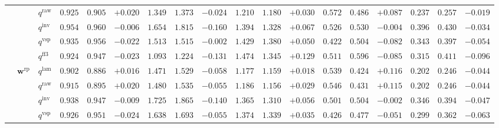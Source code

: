 \documentclass{article}
\begin{document}
\begin{table}[!htbp]
{\begin{tabular}{lll ccc ccc ccc ccc ccc}
 &  & $q^{\mathrm{raw}}$ & $0.925$ & $0.905$ & \cellcolor{posgreen!50}$+0.020$ & $1.349$ & $1.373$ & \cellcolor{negred!50}$-0.024$ & $1.210$ & $1.180$ & \cellcolor{posgreen!50}$+0.030$ & $0.572$ & $0.486$ & \cellcolor{posgreen!50}$+0.087$ & $0.237$ & $0.257$ & \cellcolor{negred!50}$-0.019$ \\
 &  & $q^{\mathrm{inv}}$ & $0.954$ & $0.960$ & \cellcolor{negred!50}$-0.006$ & $1.654$ & $1.815$ & \cellcolor{negred!50}$-0.160$ & $1.394$ & $1.328$ & \cellcolor{posgreen!50}$+0.067$ & $0.526$ & $0.530$ & \cellcolor{negred!50}$-0.004$ & $0.396$ & $0.430$ & \cellcolor{negred!50}$-0.034$ \\
 &  & $q^{\mathrm{vsp}}$ & $0.935$ & $0.956$ & \cellcolor{negred!50}$-0.022$ & $1.513$ & $1.515$ & \cellcolor{negred!50}$-0.002$ & $1.429$ & $1.380$ & \cellcolor{posgreen!50}$+0.050$ & $0.422$ & $0.504$ & \cellcolor{negred!50}$-0.082$ & $0.343$ & $0.397$ & \cellcolor{negred!50}$-0.054$ \\
 &  & $q^{\mathrm{ff3}}$ & $0.924$ & $0.947$ & \cellcolor{negred!50}$-0.023$ & $1.093$ & $1.224$ & \cellcolor{negred!50}$-0.131$ & $1.474$ & $1.345$ & \cellcolor{posgreen!50}$+0.129$ & $0.511$ & $0.596$ & \cellcolor{negred!50}$-0.085$ & $0.315$ & $0.411$ & \cellcolor{negred!50}$-0.096$ \\
\cmidrule(lr){2-18}
 & $\mathbf{w}^{\mathrm{rp}}$ & $q^{\mathrm{lam}}$ & $0.902$ & $0.886$ & \cellcolor{posgreen!50}$+0.016$ & $1.471$ & $1.529$ & \cellcolor{negred!50}$-0.058$ & $1.177$ & $1.159$ & \cellcolor{posgreen!50}$+0.018$ & $0.539$ & $0.424$ & \cellcolor{posgreen!50}$+0.116$ & $0.202$ & $0.246$ & \cellcolor{negred!50}$-0.044$ \\
 &  & $q^{\mathrm{raw}}$ & $0.915$ & $0.895$ & \cellcolor{posgreen!50}$+0.020$ & $1.480$ & $1.535$ & \cellcolor{negred!50}$-0.055$ & $1.186$ & $1.156$ & \cellcolor{posgreen!50}$+0.029$ & $0.546$ & $0.431$ & \cellcolor{posgreen!50}$+0.115$ & $0.202$ & $0.246$ & \cellcolor{negred!50}$-0.044$ \\
 &  & $q^{\mathrm{inv}}$ & $0.938$ & $0.947$ & \cellcolor{negred!50}$-0.009$ & $1.725$ & $1.865$ & \cellcolor{negred!50}$-0.140$ & $1.365$ & $1.310$ & \cellcolor{posgreen!50}$+0.056$ & $0.501$ & $0.504$ & \cellcolor{negred!50}$-0.002$ & $0.346$ & $0.394$ & \cellcolor{negred!50}$-0.047$ \\
 &  & $q^{\mathrm{vsp}}$ & $0.926$ & $0.951$ & \cellcolor{negred!50}$-0.024$ & $1.638$ & $1.693$ & \cellcolor{negred!50}$-0.055$ & $1.374$ & $1.339$ & \cellcolor{posgreen!50}$+0.035$ & $0.426$ & $0.477$ & \cellcolor{negred!50}$-0.051$ & $0.299$ & $0.362$ & \cellcolor{negred!50}$-0.063$ \\

\end{tabular}}
\end{table}
\end{document}
